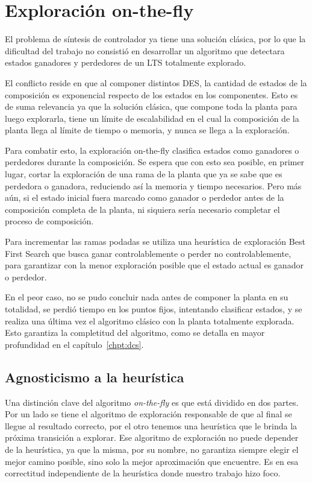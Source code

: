 \section{Exploración on-the-fly}

El problema de síntesis de controlador ya tiene una solución clásica, por lo que la dificultad del trabajo no consistió en desarrollar un algoritmo que detectara estados ganadores y perdedores de un LTS totalmente explorado. 

El conflicto reside en que al componer distintos DES, la cantidad de estados de la composición es exponencial respecto de los estados en los componentes. Esto es de suma relevancia ya que la solución clásica, que compone toda la planta para luego explorarla, tiene un límite de escalabilidad en el cual la composición de la planta llega al límite de tiempo o memoria, y nunca se llega a la exploración.

Para combatir esto, la exploración on-the-fly clasifica estados como ganadores o perdedores durante la composición. Se espera que con esto sea posible, en primer lugar, cortar la exploración de una rama de la planta que ya se sabe que es perdedora o ganadora, reduciendo así la memoria y tiempo necesarios. Pero más aún, si el estado inicial fuera marcado como ganador o perdedor antes de la composición completa de la planta, ni siquiera sería necesario completar el proceso de composición.

Para incrementar las ramas podadas se utiliza una heurística de exploración Best First Search \cite{tesisDani} que busca ganar controlablemente o perder no controlablemente, para garantizar con la menor exploración posible que el estado actual es ganador o perdedor.

En el peor caso, no se pudo concluir nada antes de componer la planta en su totalidad, se perdió tiempo en los puntos fijos, intentando clasificar estados, y se realiza una última vez el algoritmo clásico con la planta totalmente explorada. Esto garantiza la completitud del algoritmo, como se detalla en mayor profundidad en el capítulo~\ref{chpt:dcs}.

\subsection{Agnosticismo a la heurística}

Una distinción clave del algoritmo \textit{on-the-fly} es que está dividido en dos partes. Por un lado se tiene el algoritmo de exploración responsable de que al final se llegue al resultado correcto, por el otro tenemos una heurística que le brinda la próxima transición a explorar. Ese algoritmo de exploración no puede depender de la heurística, ya que la misma, por su nombre, no garantiza siempre elegir el mejor camino posible, sino solo la mejor aproximación que encuentre. Es en esa correctitud independiente de la heurística donde nuestro trabajo hizo foco.

